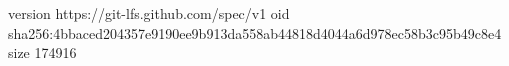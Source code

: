 version https://git-lfs.github.com/spec/v1
oid sha256:4bbaced204357e9190ee9b913da558ab44818d4044a6d978ec58b3c95b49c8e4
size 174916
